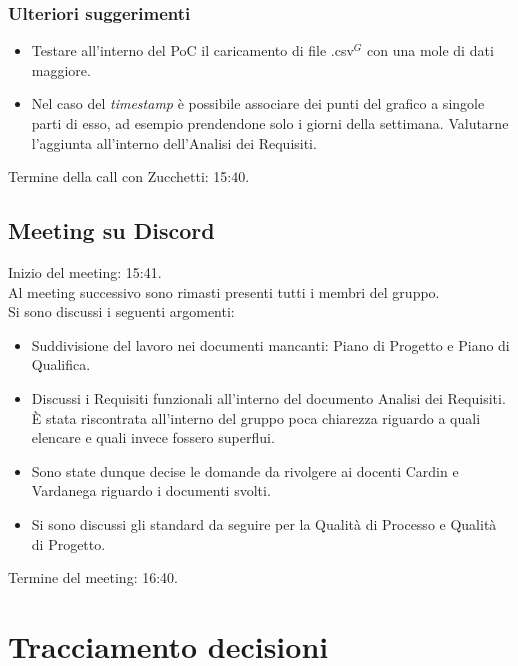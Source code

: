 \subsubsection{Ulteriori suggerimenti}
\begin{itemize}
	\item Testare all'interno del PoC il caricamento di file .csv$^{G}$ con una mole di dati maggiore.
	\item Nel caso del \textit{timestamp} è possibile associare dei punti del grafico a singole parti di esso, ad esempio prendendone solo i giorni della settimana. Valutarne l'aggiunta all'interno dell'Analisi dei Requisiti.
\end{itemize}

\noindent Termine della call con Zucchetti: 15:40.

\subsection{Meeting su Discord}
\noindent 
Inizio del meeting: 15:41. \\
\noindent Al meeting successivo sono rimasti presenti tutti i membri del gruppo. \\
Si sono discussi i seguenti argomenti:
\begin{itemize}
	\item Suddivisione del lavoro nei documenti mancanti: Piano di Progetto e Piano di Qualifica.
	\item Discussi i Requisiti funzionali all'interno del documento Analisi dei Requisiti. È stata riscontrata all'interno del gruppo poca chiarezza riguardo a quali elencare e quali invece fossero superflui.
	\item Sono state dunque decise le domande da rivolgere ai docenti Cardin e Vardanega riguardo i documenti svolti.
	\item Si sono discussi gli standard da seguire per la Qualità di Processo e Qualità di Progetto.
\end{itemize}

\noindent Termine del meeting: 16:40.


\section{Tracciamento decisioni}

